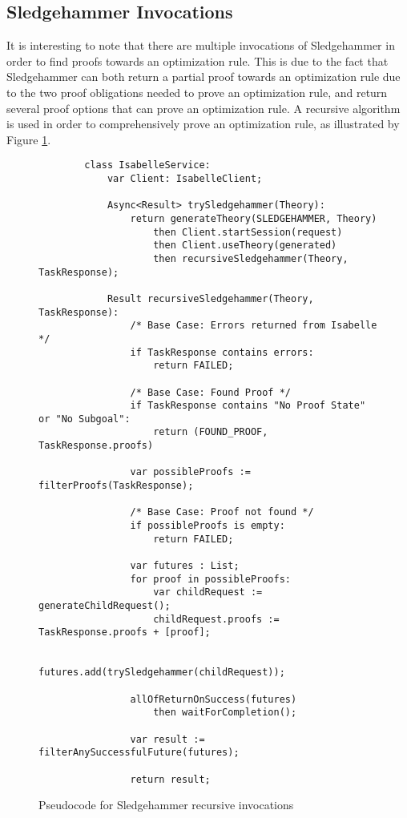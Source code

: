\subsection{Sledgehammer Invocations}

It is interesting to note that there are multiple invocations of Sledgehammer in order to find proofs towards an optimization rule. This is due 
to the fact that Sledgehammer can both return a partial proof towards an optimization rule due to the two proof obligations needed to prove an 
optimization rule, and return several proof options that can prove an optimization rule. A recursive algorithm is used in order to comprehensively 
prove an optimization rule, as illustrated by Figure \ref{fig:sledgehammerPseudocode}.

\begin{figure}[!htb]
    \begin{lstlisting}
        class IsabelleService:
            var Client: IsabelleClient;
            
            Async<Result> trySledgehammer(Theory):
                return generateTheory(SLEDGEHAMMER, Theory)
                    then Client.startSession(request)
                    then Client.useTheory(generated)
                    then recursiveSledgehammer(Theory, TaskResponse);
            
            Result recursiveSledgehammer(Theory, TaskResponse):
                /* Base Case: Errors returned from Isabelle */
                if TaskResponse contains errors:
                    return FAILED;
                
                /* Base Case: Found Proof */
                if TaskResponse contains "No Proof State" or "No Subgoal":
                    return (FOUND_PROOF, TaskResponse.proofs)
                
                var possibleProofs := filterProofs(TaskResponse);

                /* Base Case: Proof not found */
                if possibleProofs is empty:
                    return FAILED;
                
                var futures : List;
                for proof in possibleProofs:
                    var childRequest := generateChildRequest();
                    childRequest.proofs := TaskResponse.proofs + [proof];

                    futures.add(trySledgehammer(childRequest));
                
                allOfReturnOnSuccess(futures)
                    then waitForCompletion();

                var result := filterAnySuccessfulFuture(futures);

                return result;
    \end{lstlisting}

    \caption{Pseudocode for Sledgehammer recursive invocations}
    \label{fig:sledgehammerPseudocode}
\end{figure}

